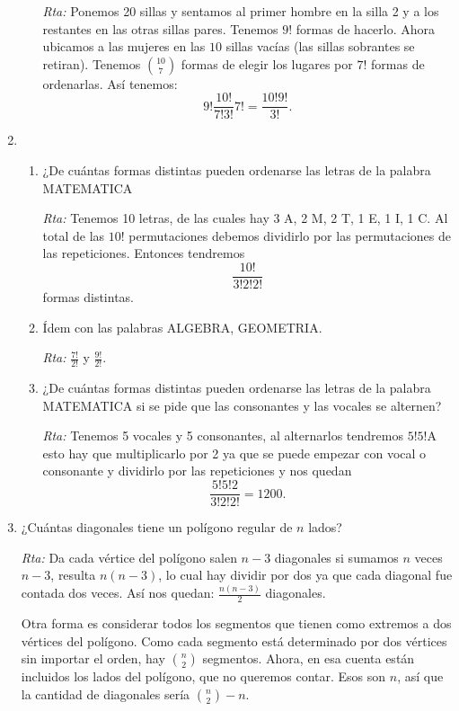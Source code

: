 \begin{enumerate}
\begin{enumerate}
    \noindent\textit{Rta:}  Ponemos 20 sillas y sentamos al primer  hombre en la silla 2 y  a los restantes en las otras sillas pares. Tenemos $9!$ formas de hacerlo. Ahora ubicamos a las mujeres en las $10$ sillas vacías (las sillas sobrantes se retiran). Tenemos $\binom{10}{7}$ formas de elegir los lugares por $7!$ formas de ordenarlas. Así tenemos: $$\displaystyle 9! \frac{10!}{7!3!} 7!=\frac{10!9!}{3!}.$$
    
    \end{enumerate}
    
    
    
    \item 
    \begin{enumerate}
    \item 
     ¿De cuántas formas distintas pueden ordenarse las letras de la palabra MATEMATICA
    
    \noindent\textit{Rta:} Tenemos 10 letras, de las cuales hay 3 A, 2 M, 2 T, 1 E, 1 I, 1 C. Al total de las $10!$ permutaciones debemos dividirlo por las permutaciones de las repeticiones. Entonces tendremos $$\frac{10!}{3!2!2!}$$ formas distintas.
    
    \item Ídem con las palabras ALGEBRA, GEOMETRIA.
    
    \noindent\textit{Rta:}  $\frac{7!}{2!}$ y $\frac{9!}{2!}$.
    
    \item ¿De cuántas formas distintas pueden ordenarse las letras de la palabra MATEMATICA
    si se pide que las consonantes y las vocales se alternen?
    
    \noindent\textit{Rta:} Tenemos 5 vocales y 5 consonantes, al alternarlos tendremos $5!5!$A esto hay que multiplicarlo por 2 ya que se puede empezar con vocal o consonante y dividirlo por las repeticiones y nos quedan $$\frac{5!5!2}{3!2!2!}=1200.$$
    \end{enumerate}
    
    
    
    \item ¿Cuántas diagonales tiene un polígono regular de $n$ lados?
    
    \noindent\textit{Rta:} Da cada vértice del polígono salen $n-3$ diagonales si sumamos $n$ veces $n-3$, resulta $n(n-3)$,  lo cual hay dividir por dos ya que cada diagonal fue contada dos veces. Así nos quedan: $ \frac{n(n-3)}{2}$ diagonales.
    
    Otra forma es considerar todos los segmentos que tienen como extremos a dos vértices del polígono. Como cada segmento está determinado por dos vértices sin importar el orden, hay $\binom{n}{2}$ segmentos. Ahora, en esa cuenta están incluidos los lados del polígono, que no queremos contar. Esos son $n$, así que la cantidad de diagonales sería $\binom{n}{2}-n$.
    

\end{enumerate}
